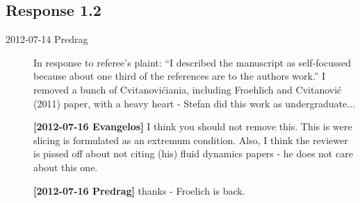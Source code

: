 \subsection{Response 1.2}
\label{sect:Response1.2}

\begin{description}

\item[2012-07-14 Predrag] In response to referee's plaint:
``I described the manuscript as self-focussed because about one third of
the references are to the authors work.'' I removed a bunch of
Cvitanovi\'ciania, including Froehlich and Cvitanovi\'c (2011) paper, with
a heavy heart - Stefan did this work as undergraduate...

{\bf [2012-07-16 Evangelos]} I think you should not remove this. This is were
		slicing is formulated as an extremum condition. Also,
		I think the reviewer is pissed off about not citing (his)
		fluid dynamics papers - he does not care about this one.

{\bf [2012-07-16 Predrag]} thanks - Froelich is back.


\end{description}
